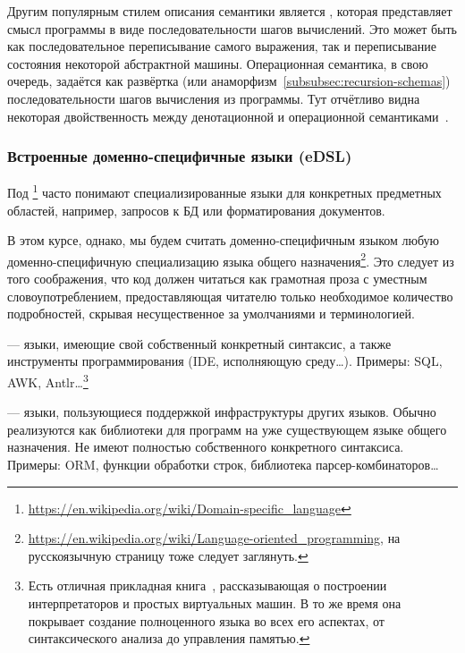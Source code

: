 Другим популярным стилем описания семантики является , которая представляет смысл программы в виде последовательности шагов вычислений.
Это может быть как последовательное переписывание самого выражения, так и переписывание состояния некоторой абстрактной машины.
Операционная семантика, в свою очередь, задаётся как развёртка (или анаморфизм~\ref{subsubsec:recursion-schemas}) последовательности шагов вычисления из программы.
Тут отчётливо видна некоторая двойственность между денотационной и операционной семантиками~\cite{hutton1998fold}.

\subsubsection{Встроенные доменно-специфичные языки (eDSL)} \label{subsubsec:edsl}

Под \footnote{\url{https://en.wikipedia.org/wiki/Domain-specific_language}} часто понимают специализированные языки для конкретных предметных областей, например, запросов к БД или форматирования документов.

В этом курсе, однако, мы будем считать доменно-специфичным языком любую доменно-специфичную специализацию языка общего назначения\footnote{\url{https://en.wikipedia.org/wiki/Language-oriented_programming}, на русскоязычную страницу тоже следует заглянуть.}.
Это следует из того соображения, что код должен читаться как грамотная проза с уместным словоупотреблением, предоставляющая читателю только необходимое количество подробностей, скрывая несущественное за умолчаниями и терминологией.

 --- языки, имеющие свой собственный конкретный синтаксис, а также инструменты программирования (IDE, исполняющую среду\ldots).
Примеры: SQL, AWK, Antlr\ldots\footnote{Есть отличная прикладная книга~\cite{nystrom2021crafting}, рассказывающая о построении интерпретаторов и простых виртуальных машин.
В то же время она покрывает создание полноценного языка во всех его аспектах, от синтаксического анализа до управления памятью.}

 --- языки, пользующиеся поддержкой инфраструктуры других языков.
Обычно реализуются как библиотеки для программ на уже существующем языке общего назначения.
Не имеют полностью собственного конкретного синтаксиса.
Примеры: ORM, функции обработки строк, библиотека парсер-комбинаторов\ldots

